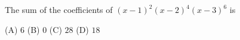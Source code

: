 The sum of the coefficients of $(x-1)^2(x-2)^4(x-3)^6$ is

(A) $6$ \quad (B) $0$ \quad (C) $28$ \quad (D) $18$
